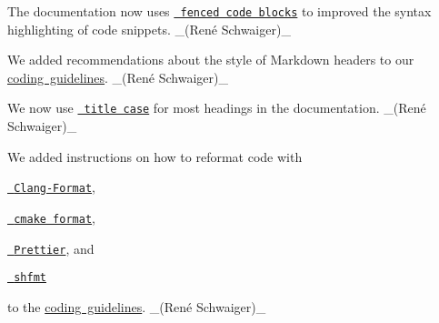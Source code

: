 \begin{DoxyItemize}
\item The documentation now uses \href{https://help.github.com/en/articles/creating-and-highlighting-code-blocks\#syntax-highlighting}{\texttt{ fenced code blocks}} to improved the syntax highlighting of code snippets. \+\_\+(René Schwaiger)\+\_\+
\item We added recommendations about the style of Markdown headers to our \mbox{\hyperlink{doc_CODING_md}{coding guidelines}}. \+\_\+(René Schwaiger)\+\_\+
\item We now use \href{https://en.wiktionary.org/wiki/title_case}{\texttt{ title case}} for most headings in the documentation. \+\_\+(René Schwaiger)\+\_\+
\item We added instructions on how to reformat code with
\begin{DoxyItemize}
\item \href{https://clang.llvm.org/docs/ClangFormat.html}{\texttt{ Clang-\/\+Format}},
\item \href{https://github.com/cheshirekow/cmake_format}{\texttt{ cmake format}},
\item \href{https://prettier.io}{\texttt{ Prettier}}, and
\item \href{https://github.com/mvdan/sh}{\texttt{ shfmt}}
\end{DoxyItemize}

to the \mbox{\hyperlink{doc_CODING_md}{coding guidelines}}. \+\_\+(René Schwaiger)\+\_\+
\end{DoxyItemize}


